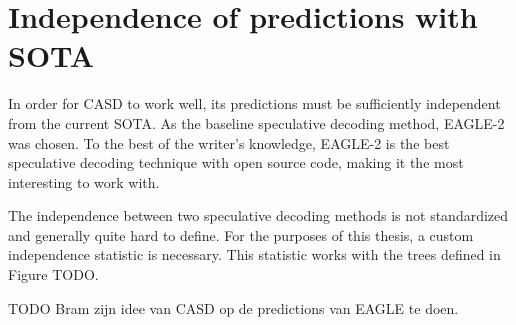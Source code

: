 \section{Independence of predictions with SOTA}
In order for CASD to work well, its predictions must be sufficiently independent from the current SOTA. As the baseline speculative decoding method, EAGLE-2 was chosen. To the best of the writer's knowledge, EAGLE-2 is the best speculative decoding technique with open source code, making it the most interesting to work with. 

The independence between two speculative decoding methods is not standardized and generally quite hard to define. For the purposes of this thesis, a custom independence statistic is necessary. This statistic works with the trees defined in Figure TODO.

TODO Bram zijn idee van CASD op de predictions van EAGLE te doen.

\section{}